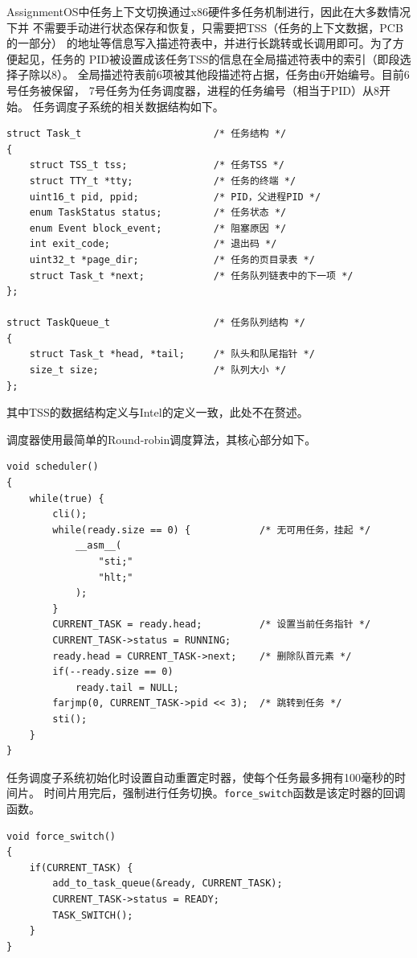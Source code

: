 \documentclass[a4paper, adobefonts]{ctexart}
\begin{document}
AssignmentOS中任务上下文切换通过x86硬件多任务机制进行，因此在大多数情况下并
不需要手动进行状态保存和恢复，只需要把TSS（任务的上下文数据，PCB的一部分）
的地址等信息写入描述符表中，并进行长跳转或长调用即可。为了方便起见，任务的
PID被设置成该任务TSS的信息在全局描述符表中的索引（即段选择子除以8）。
全局描述符表前6项被其他段描述符占据，任务由6开始编号。目前6号任务被保留，
7号任务为任务调度器，进程的任务编号（相当于PID）从8开始。
任务调度子系统的相关数据结构如下。

\begin{verbatim}
struct Task_t                       /* 任务结构 */
{
    struct TSS_t tss;               /* 任务TSS */
    struct TTY_t *tty;              /* 任务的终端 */
    uint16_t pid, ppid;             /* PID，父进程PID */
    enum TaskStatus status;         /* 任务状态 */
    enum Event block_event;         /* 阻塞原因 */
    int exit_code;                  /* 退出码 */
    uint32_t *page_dir;             /* 任务的页目录表 */
    struct Task_t *next;            /* 任务队列链表中的下一项 */
};

struct TaskQueue_t                  /* 任务队列结构 */
{
    struct Task_t *head, *tail;     /* 队头和队尾指针 */
    size_t size;                    /* 队列大小 */
};
\end{verbatim}

其中TSS的数据结构定义与Intel的定义一致，此处不在赘述。

调度器使用最简单的Round-robin调度算法，其核心部分如下。

\begin{verbatim}
void scheduler()
{
    while(true) {
        cli();
        while(ready.size == 0) {            /* 无可用任务，挂起 */
            __asm__(
                "sti;"
                "hlt;"
            );
        }
        CURRENT_TASK = ready.head;          /* 设置当前任务指针 */
        CURRENT_TASK->status = RUNNING;
        ready.head = CURRENT_TASK->next;    /* 删除队首元素 */
        if(--ready.size == 0)
            ready.tail = NULL;
        farjmp(0, CURRENT_TASK->pid << 3);  /* 跳转到任务 */
        sti();
    }
}
\end{verbatim}

任务调度子系统初始化时设置自动重置定时器，使每个任务最多拥有100毫秒的时间片。
时间片用完后，强制进行任务切换。\verb|force_switch|函数是该定时器的回调函数。

\begin{verbatim}
void force_switch()
{
    if(CURRENT_TASK) {
        add_to_task_queue(&ready, CURRENT_TASK);
        CURRENT_TASK->status = READY;
        TASK_SWITCH();
    }
}
\end{verbatim}
\end{document}
